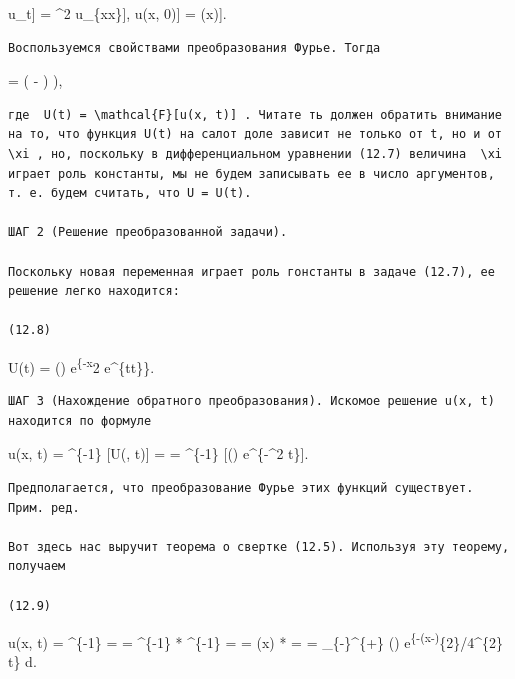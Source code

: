 \documentclass[
  ukrainian,
]{article}
\begin{document}
\mathcal{F}{[}u\_t{]} = \alpha\^{}2 \mathcal{F}{[}u\_\{xx\}{]},
\mathcal{F}{[}u(x, 0){]} = \mathcal{F}{[}\varphi(x){]}.

\begin{verbatim}
Воспользуемся свойствами преобразования Фурье. Тогда
\end{verbatim}

 =
( \Phi - \phi)  \phi),

\begin{verbatim}
где  U(t) = \mathcal{F}[u(x, t)] . Читате ть должен обратить внимание на то, что функция U(t) на салот доле зависит не только от t, но и от  \xi , но, поскольку в дифференциальном уравнении (12.7) величина  \xi  играет роль константы, мы не будем записывать ее в число аргументов, т. е. будем считать, что U = U(t).

ШАГ 2 (Решение преобразованной задачи).

Поскольку новая переменная играет роль гонстанты в задаче (12.7), ее решение легко находится:

(12.8)
\end{verbatim}

U(t) = \Phi(\xi) e\textsuperscript{\{-x}2 e\^{}\{tt\}\}.

\begin{verbatim}
ШАГ 3 (Нахождение обратного преобразования). Искомое решение u(x, t) находится по формуле
\end{verbatim}

u(x, t) = \^{}\{-1\} {[}U(\xi, t){]} = =
\^{}\{-1\} {[}\Phi(\xi) e\^{}\{-\alpha \xi\^{}2 t\}{]}.

\begin{verbatim}
Предполагается, что преобразование Фурье этих функций существует. Прим. ред.

Вот здесь нас выручит теорема о свертке (12.5). Используя эту теорему, получаем

(12.9)
\end{verbatim}

u(x, t) = \^{}\{-1\}
 = =
\^{}\{-1\} \left[ \Phi(\xi) \right] * \^{}\{-1\}
 = = \Phi(x) *
 
= =  \int\_\{-\infty\}\^{}\{+\infty\}
\Phi(\xi) e\textsuperscript{\{-(x-\xi)}\{2\}/4\alpha\^{}\{2\} t\} d\xi.
\end{document}
